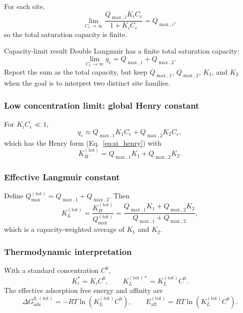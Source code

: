 \documentclass[journal=jacsat,manuscript=article]{achemso}
\begin{document}
For each site,
\begin{equation}
	\lim_{C_e \to \infty} \frac{Q_{\max,i} K_i C_e}{1 + K_i C_e}
	= Q_{\max,i},
\end{equation}
so the total saturation capacity is finite.

\begin{greenbox}{Capacity-limit result}
	Double Langmuir has a finite total saturation capacity:
	\begin{equation}
		\lim_{C_e \to \infty} q_e = Q_{\max,1} + Q_{\max,2}.
	\end{equation}
	Report the sum as the total capacity, but keep \(Q_{\max,1}\),
	\(Q_{\max,2}\), \(K_1\), and \(K_2\) when the goal is to interpret
	two distinct site families.
\end{greenbox}

\subsubsection{Low concentration limit: global Henry constant}

For \(K_i C_e \ll 1\),
\begin{equation}
	q_e \approx Q_{\max,1} K_1 C_e + Q_{\max,2} K_2 C_e,
\end{equation}
which has the Henry form (Eq.~\eqref{eq:si_henry}) with
\begin{equation}
	K_H^{\mathrm{(tot)}}
	= Q_{\max,1} K_1 + Q_{\max,2} K_2.
\end{equation}


\subsubsection{Effective Langmuir constant}

Define \(Q_{\max}^{\mathrm{(tot)}} = Q_{\max,1} + Q_{\max,2}\). Then
\begin{equation}
	K_L^{\mathrm{(tot)}}
	= \frac{K_H^{\mathrm{(tot)}}}{Q_{\max}^{\mathrm{(tot)}}}
	= \frac{Q_{\max,1} K_1 + Q_{\max,2} K_2}
	{Q_{\max,1} + Q_{\max,2}},
\end{equation}
which is a capacity-weighted average of \(K_1\) and \(K_2\).

\subsubsection{Thermodynamic interpretation}

With a standard concentration \(C^0\),
\begin{equation}
	K_i^{\ast} = K_i C^0,
	\qquad
	K_L^{\mathrm{(tot)}\ast} = K_L^{\mathrm{(tot)}} C^0.
\end{equation}
The effective adsorption free energy and affinity are
\begin{equation}
	\Delta G_{\mathrm{ads}}^{0,\mathrm{(tot)}}
	= - R T \ln\left( K_L^{\mathrm{(tot)}} C^0 \right),
	\qquad
	E_{\mathrm{aff}}^{\mathrm{(tot)}}
	= R T \ln\left( K_L^{\mathrm{(tot)}} C^0 \right).
\end{equation}
\end{document}
